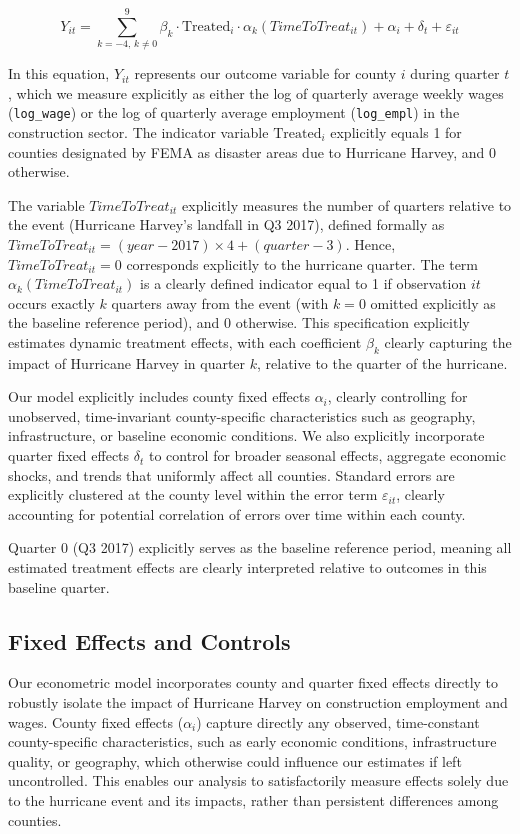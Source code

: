 \documentclass{article}
\begin{document}
\[
Y_{it} = \sum_{k=-4,\,k\neq0}^{9} \beta_k \cdot \text{Treated}_i \cdot \alpha_k(TimeToTreat_{it}) + \alpha_i + \delta_t + \varepsilon_{it}
\]

In this equation, \(Y_{it}\) represents our outcome variable for county \(i\) during quarter \(t\), which we measure explicitly as either the log of quarterly average weekly wages (\texttt{log\_wage}) or the log of quarterly average employment (\texttt{log\_empl}) in the construction sector. The indicator variable \(\text{Treated}_i\) explicitly equals 1 for counties designated by FEMA as disaster areas due to Hurricane Harvey, and 0 otherwise. 

The variable \(TimeToTreat_{it}\) explicitly measures the number of quarters relative to the event (Hurricane Harvey's landfall in Q3 2017), defined formally as \(TimeToTreat_{it} = (year - 2017)\times4 + (quarter - 3)\). Hence, \(TimeToTreat_{it}=0\) corresponds explicitly to the hurricane quarter. The term \(\alpha_k(TimeToTreat_{it})\) is a clearly defined indicator equal to 1 if observation \(it\) occurs exactly \(k\) quarters away from the event (with \(k=0\) omitted explicitly as the baseline reference period), and 0 otherwise. This specification explicitly estimates dynamic treatment effects, with each coefficient \(\beta_k\) clearly capturing the impact of Hurricane Harvey in quarter \(k\), relative to the quarter of the hurricane.

Our model explicitly includes county fixed effects \(\alpha_i\), clearly controlling for unobserved, time-invariant county-specific characteristics such as geography, infrastructure, or baseline economic conditions. We also explicitly incorporate quarter fixed effects \(\delta_t\) to control for broader seasonal effects, aggregate economic shocks, and trends that uniformly affect all counties. Standard errors are explicitly clustered at the county level within the error term \(\varepsilon_{it}\), clearly accounting for potential correlation of errors over time within each county.

Quarter 0 (Q3 2017) explicitly serves as the baseline reference period, meaning all estimated treatment effects are clearly interpreted relative to outcomes in this baseline quarter.

\subsection{Fixed Effects and Controls}

Our econometric model incorporates county and quarter fixed effects directly to robustly isolate the impact of Hurricane Harvey on construction employment and wages. County fixed effects (\( \alpha_i \)) capture directly any observed, time-constant county-specific characteristics, such as early economic conditions, infrastructure quality, or geography, which otherwise could influence our estimates if left uncontrolled. This enables our analysis to satisfactorily measure effects solely due to the hurricane event and its impacts, rather than persistent differences among counties.
\end{document}
